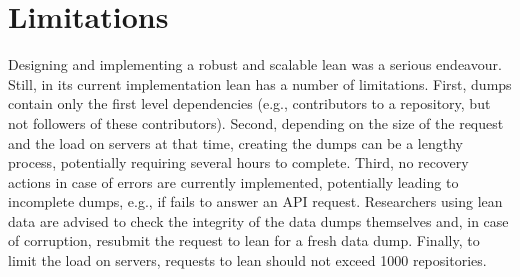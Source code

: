 
\section{Limitations}
\label{sec:limitations}

Designing and implementing a robust and scalable lean \ght was a serious endeavour.
Still, in its current implementation lean \ght has a number of limitations.
First, dumps contain only the first level dependencies (e.g., contributors to a repository, but not followers of these
contributors).
Second, depending on the size of the request and the load on \ght servers at that time, creating the dumps
can be a lengthy process, potentially requiring several hours to complete.
Third, no recovery actions in case of errors are currently implemented, potentially leading to incomplete dumps,
e.g., if \gh fails to answer an API request.
Researchers using lean \ght data are advised to check the integrity of the data dumps themselves and, 
in case of corruption, resubmit the request to lean \ght for a fresh data dump.
Finally, to limit the load on \ght servers, requests to lean \ght should not exceed 1000 repositories.

